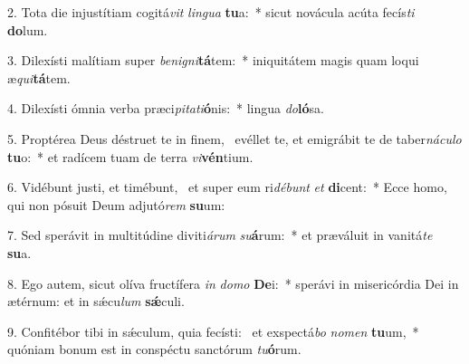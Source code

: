 2. Tota die injustítiam cogitá\textit{vit} \textit{lin}\textit{gua} \textbf{tu}a:~*  sicut novácula acúta fecís\textit{ti} \textbf{do}lum.\

3. Dilexísti malítiam super \textit{be}\textit{ni}\textit{gni}\textbf{tá}tem:~*  iniquitátem magis quam loqui æ\textit{qui}\textbf{tá}tem.\

4. Dilexísti ómnia verba præci\textit{pi}\textit{ta}\textit{ti}\textbf{ó}nis:~*  lingua \textit{do}\textbf{ló}sa.\

5. Proptérea Deus déstruet te in finem, \dag\  evéllet te, et emigrábit te de taber\textit{ná}\textit{cu}\textit{lo} \textbf{tu}o:~*  et radícem tuam de terra \textit{vi}\textbf{vén}tium.\

6. Vidébunt justi, et timébunt, \dag\  et super eum ri\textit{dé}\textit{bunt} \textit{et} \textbf{di}cent:~*  Ecce homo, qui non pósuit Deum adjutó\textit{rem} \textbf{su}um:\

7. Sed sperávit in multitúdine diviti\textit{á}\textit{rum} \textit{su}\textbf{á}rum:~*  et præváluit in vanitá\textit{te} \textbf{su}a.\

8. Ego autem, sicut olíva fructífera \textit{in} \textit{do}\textit{mo} \textbf{De}i:~*  sperávi in misericórdia Dei in ætérnum: et in sǽcu\textit{lum} \textbf{sǽ}culi.\

9. Confitébor tibi in sǽculum, quia fecísti: \dag\  et exspectá\textit{bo} \textit{no}\textit{men} \textbf{tu}um,~*  quóniam bonum est in conspéctu sanctórum \textit{tu}\textbf{ó}rum.\

